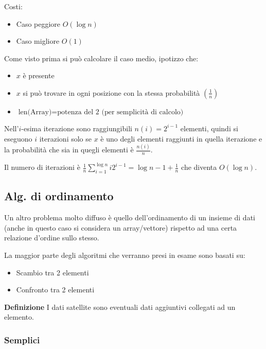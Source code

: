 \documentclass{article}
\begin{document}
\noindent Costi:
\begin{itemize}
    \item Caso peggiore $O(\log n)$
    \item Caso migliore $O(1)$\newline
\end{itemize}

\noindent Come visto prima si può calcolare il caso medio, ipotizzo che:
\begin{itemize}
    \item $x$ è presente
    \item $x$ si può trovare in ogni posizione con la stessa probabilità $(\frac{1}{n})$
    \item $\text{len(Array)}=\text{potenza del 2 (per semplicità di calcolo)}$\newline
\end{itemize}

\noindent Nell'$i$-esima iterazione sono raggiungibili $n(i)=2^{i-1}$ elementi, quindi si eseguono $i$ iterazioni solo se $x$ è uno degli elementi raggiunti in quella iterazione e la probabilità che sia in quegli elementi è $\frac{n(i)}{n}$.\newline

\noindent Il numero di iterazioni è $\frac{1}{n}\sum_{i=1}^{\log n}i2^{i-1}=\log n-1+\frac{1}{n}$ che diventa $O(\log n)$.

\subsection{Alg. di ordinamento}

Un altro problema molto diffuso è quello dell'ordinamento di un insieme di dati (anche in questo caso si considera un array/vettore) rispetto ad una certa relazione d'ordine sullo stesso.\newline

\noindent La maggior parte degli algoritmi che verranno presi in esame sono basati su:
\begin{itemize}
    \item Scambio tra 2 elementi
    \item Confronto tra 2 elementi\newline
\end{itemize}

\noindent\textbf{Definizione} I dati satellite sono eventuali dati aggiuntivi collegati ad un elemento.\newline

\subsubsection{Semplici}
\end{document}

